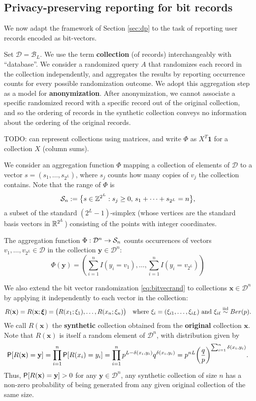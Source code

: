 \documentclass[11pt,draft]{article}
\newcommand{\Dsp}{\mathcal{D}}
\newcommand{\Ssp}{\mathcal{S}}
\newcommand{\Bsp}{\mathcal{B}}
\newcommand{\xv}{\mathbf{x}}
\newcommand{\yv}{\mathbf{y}}
\begin{document}
\subsection{Privacy-preserving reporting for bit records}

We now adapt the framework of Section \ref{sec:dp} to the task of reporting
user records encoded as bit-vectors.

Set $\Dsp = \Bsp_L$. We use the term \textbf{collection} (of records)
interchangeably with ``database''.
We consider a randomized query $A$ that randomizes each record in the
collection independently, and aggregates the results by reporting occurrence
counts for every possible randomization outcome.
We adopt this aggregation step as a model for \textbf{anonymization}.
After anonymization, we cannot associate a specific randomized record with
a specific record out of the original collection, and so the ordering of
records in the synthetic collection conveys no information about the ordering
of the original records.

TODO: can represent collections using matrices, and write $\Phi$ as 
$X^T\mathbf{1}$ for a collection $X$ (column sums).

We consider an aggregation function $\Phi$ mapping a collection of elements of
$\Dsp$ to a vector $s = (s_1,\dots,s_{2^L})$, where $s_j$ counts how
many copies of $v_j$ the collection contains.
Note that the range of $\Phi$ is
\[ \Ssp_n := \big\{ s \in \Z^{2^L}: s_j \geq 0,\,
s_1 +\cdots + s_{2^L} = n\big\}, \]
a subset of the standard $(2^L-1)$-simplex (whose vertices are the standard
basis vectors in $\mathbb{R}^{2^L}$) consisting of the points with integer coordinates.

\begin{defn}
The aggregation function $\map{\Phi}{\Dsp^n}{\Ssp_n}$ counts occurrences of
vectors $v_1,\dots, v_{2^L} \in \Dsp$ in the collection $\yv \in \Dsp^n$:
\[ \Phi(\yv) = \left(\sum_{i = 1}^n I(y_i = v_1),\dots,
\sum_{i = 1}^n I(y_i = v_{2^L}) \right)
\]
\end{defn}

We also extend the bit vector randomization \eqref{eq:bitvecrand} to
collections $\xv\in\Dsp^n$ by applying it independently to each vector in the
collection:
\[ R(\xv) = R(\xv;\boldsymbol{\xi})
= \big(R(x_1;\xi_1),\dots,R(x_n; \xi_n)\big)
\quad\text{where } \xi_i = (\xi_{i1},\dots,\xi_{iL}) \text{ and }
\xi_{i\ell} \iid Ber(p). \]
We call $R(\xv)$ the \textbf{synthetic} collection obtained from the
\textbf{original} collection $\xv$.
Note that $R(\xv)$ is itself a random element of $\Dsp^n$, with distribution
given by
\[ \P[R(\xv) = \yv] = \prod_{i=1}^n \P[R(x_i) = y_i] =
\prod_{i=1}^n p^{L-\delta(x_i,y_i)}q^{\delta(x_i,y_i)} =
p^{nL} \bigg(\frac{q}{p}\bigg)^{\sum_{i=1}^n \delta(x_i, y_i)}.
\]
Thus, $\P[R(\xv) = \yv] > 0$ for any $\yv\in\Dsp^n$, \ie any synthetic
collection of size $n$ has a non-zero probability of being generated from any
given original collection of the same size.
\end{document}
